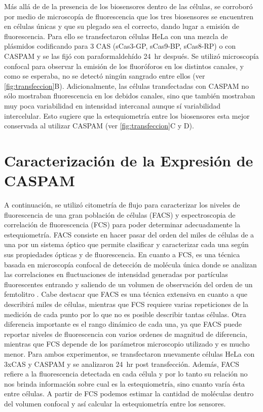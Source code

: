 Más allá de de la presencia de los biosensores dentro de las células, se corroboró por medio de microscopía de fluorescencia que los tres biosensores se encuentren en células únicas y que su plegado sea el correcto, dando lugar a emisión de fluorescencia. Para ello se transfectaron células HeLa con una mezcla de plásmidos codificando para 3 CAS (sCas3-GP, sCas9-BP, sCas8-RP) o con CASPAM y se las fijó con paraformaldehído 24~hr después. Se utilizó microscopía confocal para observar la emisión de los fluoróforos en los distintos canales, y como se esperaba, no se detectó ningún sangrado entre ellos (ver \cref{fig:transfeccion}B). Adicionalmente, las células transfectadas con CASPAM no sólo mostraban fluorescencia en los debidos canales, sino que también mostraban muy poca variabilidad en intensidad intercanal aunque sí variabilidad intercelular. Esto sugiere que la estequiometría entre los biosensores esta mejor conservada al utilizar CASPAM (ver \cref{fig:transfeccion}C y D).


\section{Caracterización de la Expresión de CASPAM}


A continuación, se utilizó citometría de flujo para caracterizar los niveles de fluorescencia de una gran población de células (FACS) y espectroscopia de correlación de fluorescencia (FCS) para poder determinar adecuadamente la estequiometría. FACS consiste en hacer pasar del orden del miles de células de a una por un sistema óptico que permite clasificar y caracterizar cada una según sus propiedades ópticas y de fluorescencia. En cuanto a FCS, es una técnica basada en microscopía confocal de detección de molécula única donde se analizan las correlaciones en fluctuaciones de intensidad generadas por partículas fluorescentes entrando y saliendo de un volumen de observación del orden de un femtolitro \citep{Digman2008}. Cabe destacar que FACS es una técnica extensiva en cuanto a que describirá miles de células, mientras que FCS requiere varias repeticiones de la medición de cada punto por lo que no es posible describir tantas células. Otra diferencia importante es el rango dinámico de cada una, ya que FACS puede reportar niveles de fluorescencia con varios ordenes de magnitud de diferencia, mientras que FCS depende de los parámetros microscopio utilizado y es mucho menor. Para ambos experimentos, se transfectaron nuevamente células HeLa con 3xCAS y CASPAM y se analizaron 24~hr post transfección. Además, FACS refiere a la fluorescencia detectada en cada célula y por lo tanto su relación no nos brinda información sobre cual es la estequiometría, sino cuanto varía ésta entre células. A partir de FCS podemos estimar la cantidad de moléculas dentro del volumen confocal y así calcular la estequiometría entre los sensores.


